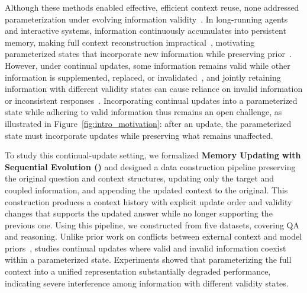 Although these methods enabled effective, efficient context reuse, none addressed parameterization under evolving information validity~\citep{liu2025model,tian2026anyedit}.
In long-running agents and interactive systems, information continuously accumulates into persistent memory, making full context reconstruction impractical~\citep{park2023generative,packer2023memgpt,zhong2024memorybank}, motivating parameterized states that incorporate new information while preserving prior~\citep{jang2022temporalwiki}.
However, under continual updates, some information remains valid while other information is supplemented, replaced, or invalidated~\citep{wallat2026facts}, and jointly retaining information with different validity states can cause reliance on invalid information or inconsistent responses~\citep{marjanovic2024dynamicqa,wallat2026facts}.
Incorporating continual updates into a parameterized state while adhering to valid information thus remains an open challenge, as illustrated in Figure~\ref{fig:intro_motivation}: after an update, the parameterized state must incorporate updates while preserving what remains unaffected.

To study this continual-update setting, we formalized \textbf{Memory Updating with Sequential Evolution (\task{})} and designed a data construction pipeline preserving the original question and context structures, updating only the target and coupled information, and appending the updated context to the original.
This construction produces a context history with explicit update order and validity changes that supports the updated answer while no longer supporting the previous one.
Using this pipeline, we constructed \benchmark{} from five datasets, covering QA and reasoning.
Unlike prior work on conflicts between external context and model priors~\citep{xie2024adaptive,xu2024knowledge,kortukov2024studying}, \benchmark{} studies continual updates where valid and invalid information coexist within a parameterized state.
Experiments showed that parameterizing the full context into a unified representation substantially degraded performance, indicating severe interference among information with different validity states.

